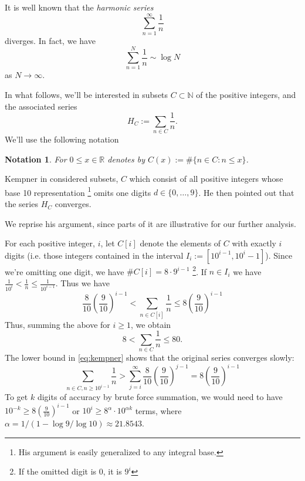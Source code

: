 \documentclass{article}
\newtheorem{notation}[section]{Notation}
\begin{document}
It is well known that the \emph{harmonic series}
\begin{displaymath}
  \sum_{n=1}^\infty \frac{1}{n}
\end{displaymath}
diverges. In fact, we have
\begin{displaymath}
  \sum_{n=1}^N \frac{1}{n} \sim \log N
\end{displaymath}
as $N \rightarrow \infty$.

In what follows, we'll be interested in subsets $C \subset \mathbb{N}$
of the positive integers, and the associated series
\begin{equation}
  \label{eq:harmonic}
  H_C := \sum_{n \in C} \frac{1}{n}.
\end{equation}
We'll use the following notation
\begin{notation}
  For $0 \le x \in \mathbb{R}$ denotes by $C(x) := \#\{n \in C: n \le x\}$.
\end{notation}

Kempner in \cite{kempner1914curious}
considered subsets, $C$ which consist of all positive integers whose
base 10 representation
\footnote{His argument is easily generalized to any integral base.}
omits one digits $d \in \{0,\dots,9\}$. He then
pointed out that the series $H_C$ converges.

We reprise his argument, since parts of it are illustrative for our
further analysis.

For each positive integer, $i$, let $C[i]$ denote the elements of
$C$ with exactly $i$ digits (i.e. those integers contained in the
interval
$I_i := [10^{i-1}, 10^i -1]$).
Since we're omitting one digit, we have $\# C[i] = 8\cdot 9^{i-1}$
\footnote{If the omitted digit is 0, it is $9^i$}. If $n\in I_i$ we
have $\frac{1}{10^i} < \frac{1}{n} \le \frac{1}{10^{i-1}}$.
Thus we have
\begin{equation}
\label{eq:kempner}
\frac{8}{10}\left(\frac{9}{10}\right)^{i-1}
< \sum_{n \in C[i]} \frac{1}{n} \le 8\left(\frac{9}{10}\right)^{i-1}
\end{equation}
Thus, summing the above for $i\ge 1$, we obtain
\begin{displaymath}
  8 < \sum_{n \in C} \frac{1}{n} \le 80.
\end{displaymath}
The lower bound in \eqref{eq:kempner} shows that the original series
converges slowly:
\begin{displaymath}
  \sum_{n \in C, n \ge 10^{i-1}} \frac{1}{n} > \sum_{j=i}^\infty
  \frac{8}{10} \left(\frac{9}{10}\right)^{j-1} = 8 \left( \frac{9}{10}\right)^{i-1}
\end{displaymath}
To get $k$ digits of accuracy by brute force summation, we would need
to have $10^{-k} \ge 8 \left( \frac{9}{10}\right)^{i-1}$ or
$10^i \ge 8^\alpha \cdot 10^{\alpha k}$ terms,
where $\alpha = 1/(1-\log 9/\log {10}) \approx 21.8543$.
\end{document}

